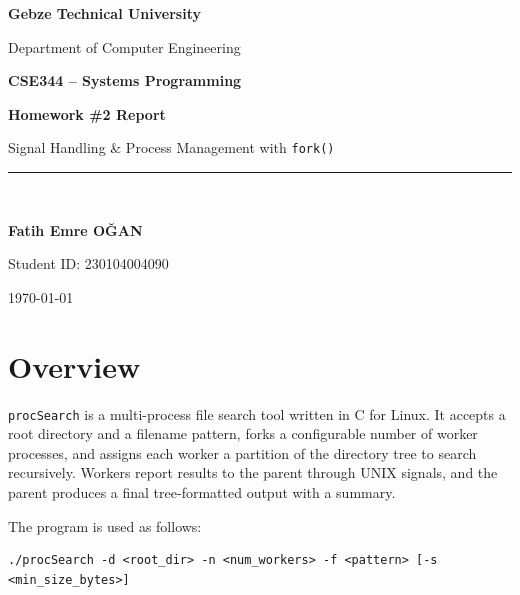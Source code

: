 \documentclass[12pt, a4paper]{article}
\begin{document}
\begin{titlepage}
    \centering
    \vspace*{2cm}
    {\LARGE \textbf{Gebze Technical University} \par}
    \vspace{0.5cm}
    {\large Department of Computer Engineering \par}
    \vspace{2cm}
    {\Huge \textbf{CSE344 -- Systems Programming} \par}
    \vspace{1cm}
    {\LARGE \textbf{Homework \#2 Report} \par}
    \vspace{0.5cm}
    {\large Signal Handling \& Process Management with \texttt{fork()} \par}
    \vspace{2cm}
    \rule{0.6\textwidth}{0.4pt} \\[0.5cm]
    {\large \textbf{Fatih Emre OĞAN} \par}
    {\large Student ID: 230104004090 \par}
    \vspace{1cm}
    {\large \today \par}
    \vfill
\end{titlepage}

\tableofcontents
\newpage

\section{Overview}

\texttt{procSearch} is a multi-process file search tool written in C for Linux. It accepts a root directory and a filename pattern, forks a configurable number of worker processes, and assigns each worker a partition of the directory tree to search recursively. Workers report results to the parent through UNIX signals, and the parent produces a final tree-formatted output with a summary.

The program is used as follows:

\begin{lstlisting}
./procSearch -d <root_dir> -n <num_workers> -f <pattern> [-s <min_size_bytes>]
\end{lstlisting}
\end{document}
